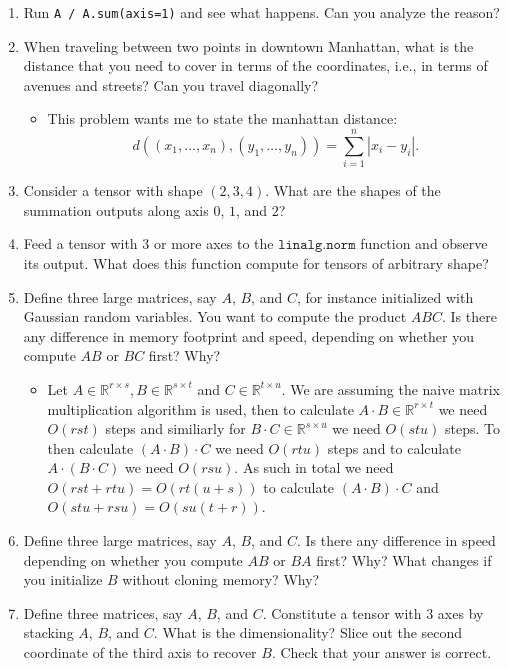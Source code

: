 \documentclass{article}
\begin{document}
\begin{enumerate}
    \item Run \texttt{A / A.\texttt{sum}(axis=1)} and see what happens. Can you analyze the reason?

    \item When traveling between two points in downtown Manhattan, what is the distance that you need to cover in terms of the coordinates, i.e., in terms of avenues and streets? Can you travel diagonally?
    	\begin{itemize}
    		\item This problem wants me to state the manhattan distance:
    		$$
    		d((x_1, \dots, x_n), (y_1, \dots, y_n)) = \sum_{i = 1}^n |x_i - y_i|.
    		$$
    	\end{itemize}

    \item Consider a tensor with shape $(2, 3, 4)$. What are the shapes of the summation outputs along axis $0$, $1$, and $2$?

    \item Feed a tensor with $3$ or more axes to the $\texttt{linalg.norm}$ function and observe its output. What does this function compute for tensors of arbitrary shape?

    \item Define three large matrices, say $A$, $B$, and $C$, for instance initialized with Gaussian random variables. You want to compute the product $ABC$. Is there any difference in memory footprint and speed, depending on whether you compute $AB$ or $BC$ first? Why?
    \begin{itemize}
    	\item Let $A \in \mathbb{R}^{r \times s}, B \in \mathbb{R}^{s \times t}$ and $C \in \mathbb{R}^{t \times u}$. We are assuming the naive matrix multiplication algorithm is used, then to calculate $A \cdot B \in \mathbb{R}^{r \times t}$ we need $O(rst)$ steps and similiarly for $B \cdot C \in \mathbb{R}^{s \times u}$ we need $O(s t u)$ steps. To then calculate $(A \cdot B) \cdot C$ we need $O(rtu)$ steps and to calculate $A \cdot (B \cdot C)$ we need $O(rsu)$. As such in total we need $O(rst + rtu) = O(rt(u + s))$ to calculate $(A \cdot B) \cdot C$ and $O(stu + rsu) = O(su(t + r))$.
    \end{itemize}

    \item Define three large matrices, say $A$, $B$, and $C$. Is there any difference in speed depending on whether you compute $AB$ or $BA$ first? Why? What changes if you initialize $B$ without cloning memory? Why?

    \item Define three matrices, say $A$, $B$, and $C$. Constitute a tensor with $3$ axes by stacking $A$, $B$, and $C$. What is the dimensionality? Slice out the second coordinate of the third axis to recover $B$. Check that your answer is correct.
\end{enumerate}
\end{document}
